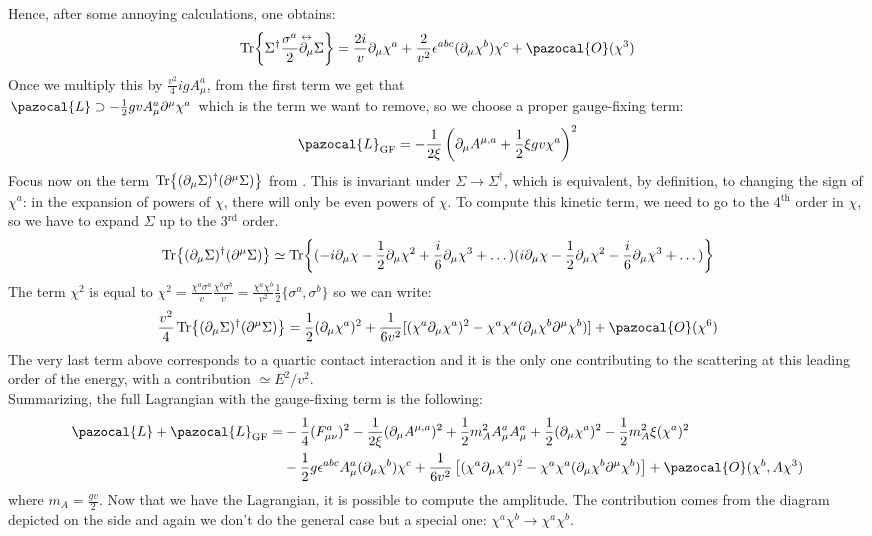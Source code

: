 \documentclass[../main.tex]{subfiles}
\begin{document}
Hence, after some annoying calculations, one obtains:
\[
\Tr{\Sigma^\dagger\frac{\sigma^a}{2}\overset{\leftrightarrow}{\partial_\mu}\Sigma}=\frac{2i}{v}\partial_\mu\chi^a+\frac{2}{v^2}\epsilon^{abc}(\partial_\mu\chi^b)\chi^c+\pazocal{O}(\chi^3)
\]
Once we multiply this by $\frac{v^2}{4}igA_\mu^a$, from the first term we get that\\
$\pazocal{L}\supset-\frac{1}{2}gvA_\mu^a\partial^\mu\chi^a$ which is the term we want to remove, so we choose a proper gauge-fixing term:
\[
\pazocal{L}_{\text{GF}}=-\frac{1}{2\xi}\left(\partial_\mu A^{\mu,a}+\frac{1}{2}\xi gv\chi^a\right)^2
\]
Focus now on the term $\Tr{(\partial_\mu\Sigma)^\dagger(\partial^\mu\Sigma)}$ from . This is invariant under $\Sigma\to\Sigma^\dagger$, which is equivalent, by definition, to changing the sign of $\chi^a$: in the expansion of powers of $\chi$, there will only be even powers of $\chi$. To compute this kinetic term, we need to go to the 4$^\text{th}$ order in $\chi$, so we have to expand $\Sigma$ up to the 3$^\text{rd}$ order.
\[
\Tr{(\partial_\mu\Sigma)^\dagger(\partial^\mu\Sigma)}\simeq\Tr{(-i\partial_\mu\chi-\frac{1}{2}\partial_\mu\chi^2+\frac{i}{6}\partial_\mu\chi^3+\dots)(i\partial_\mu\chi-\frac{1}{2}\partial_\mu\chi^2-\frac{i}{6}\partial_\mu\chi^3+\dots)}
\]
The term $\chi^2$ is equal to $\chi^2=\frac{\chi^a\sigma^a}{v}\frac{\chi^b\sigma^b}{v}=\frac{\chi^a\chi^b}{v^2}\frac{1}{2}\{\sigma^a,\sigma^b\}$ so we can write:
\[
\frac{v^2}{4}\Tr{(\partial_\mu\Sigma)^\dagger(\partial^\mu\Sigma)}=\frac{1}{2}(\partial_\mu\chi^a)^2+\frac{1}{6v^2}[(\chi^a\partial_\mu\chi^a)^2-\chi^a\chi^a(\partial_\mu\chi^b\partial^\mu\chi^b)]+\pazocal{O}(\chi^6)
\]
The very last term above corresponds to a quartic contact interaction and it is the only one contributing to the scattering at this leading order of the energy, with a contribution $\simeq E^2/v^2$.\\
Summarizing, the full Lagrangian with the gauge-fixing term is the following:
\begin{align*}
\pazocal{L}+\pazocal{L}_{\text{GF}}=&-\frac{1}{4}(F_{\mu\nu}^a)^2-\frac{1}{2\xi}(\partial_\mu A^{\mu,a})^2+\frac{1}{2}m_A^2A_\mu^aA_\mu^a+\frac{1}{2}(\partial_\mu\chi^a)^2-\frac{1}{2}m_A^2\xi(\chi^a)^2\\
&-\frac{1}{2}g\epsilon^{abc}A_\mu^a(\partial_\mu\chi^b)\chi^c+\frac{1}{6v^2}\left[(\chi^a\partial_\mu\chi^a)^2-\chi^a\chi^a(\partial_\mu\chi^b\partial^\mu\chi^b)\right]+\pazocal{O}(\chi^b,A\chi^3)
\end{align*}
where $m_A=\frac{gv}{2}$. Now that we have the Lagrangian, it is possible to compute the amplitude. The contribution comes from the diagram depicted on the side and again we don't do the general case but a special one: $\chi^a\chi^b\to\chi^a\chi^b$.
\end{document}
